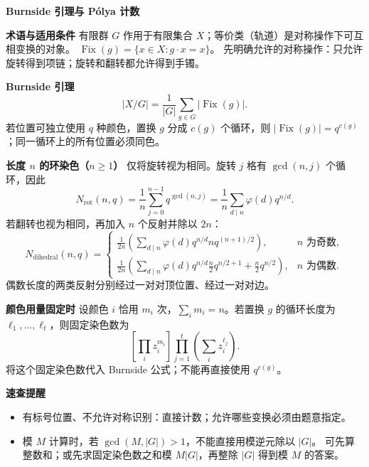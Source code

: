 \textbf{Burnside 引理与 Pólya 计数}

\textbf{术语与适用条件}
有限群 $G$ 作用于有限集合 $X$；等价类（轨道）是对称操作下可互相变换的对象。
$\operatorname{Fix}(g)=\{x\in X:g\cdot x=x\}$。
先明确允许的对称操作：只允许旋转得到项链；旋转和翻转都允许得到手镯。

\textbf{Burnside 引理}
\[
|X/G|=\frac{1}{|G|}\sum_{g\in G}|\operatorname{Fix}(g)|.
\]
若位置可独立使用 $q$ 种颜色，置换 $g$ 分成 $c(g)$ 个循环，则
$|\operatorname{Fix}(g)|=q^{c(g)}$；同一循环上的所有位置必须同色。

\textbf{长度 $n$ 的环染色（$n\ge 1$）}
仅将旋转视为相同。旋转 $j$ 格有 $\gcd(n,j)$ 个循环，因此
\[
N_{\mathrm{rot}}(n,q)
=\frac{1}{n}\sum_{j=0}^{n-1}q^{\gcd(n,j)}
=\frac{1}{n}\sum_{d\mid n}\varphi(d)q^{n/d}.
\]
若翻转也视为相同，再加入 $n$ 个反射并除以 $2n$：
\[
N_{\mathrm{dihedral}}(n,q)=
\begin{cases}
\displaystyle\frac{1}{2n}\left(\sum_{d\mid n}\varphi(d)q^{n/d}
 nq^{(n+1)/2}\right),&n\text{ 为奇数},\\[6pt]
\displaystyle\frac{1}{2n}\left(\sum_{d\mid n}\varphi(d)q^{n/d}
 \frac n2 q^{n/2+1}+\frac n2 q^{n/2}\right),&n\text{ 为偶数}.
\end{cases}
\]
偶数长度的两类反射分别经过一对对顶位置、经过一对对边。

\textbf{颜色用量固定时}
设颜色 $i$ 恰用 $m_i$ 次，$\sum_i m_i=n$。若置换 $g$ 的循环长度为
$\ell_1,\ldots,\ell_t$，则固定染色数为
\[
\left[\prod_i z_i^{m_i}\right]
\prod_{j=1}^{t}\left(\sum_i z_i^{\ell_j}\right).
\]
将这个固定染色数代入 Burnside 公式；不能再直接使用 $q^{c(g)}$。

\textbf{速查提醒}
\begin{itemize}
    \item 有标号位置、不允许对称识别：直接计数；允许哪些变换必须由题意指定。
    \item 模 $M$ 计算时，若 $\gcd(M,|G|)>1$，不能直接用模逆元除以 $|G|$。
    可先算整数和；或先求固定染色数之和模 $M|G|$，再整除 $|G|$ 得到模 $M$ 的答案。
\end{itemize}
